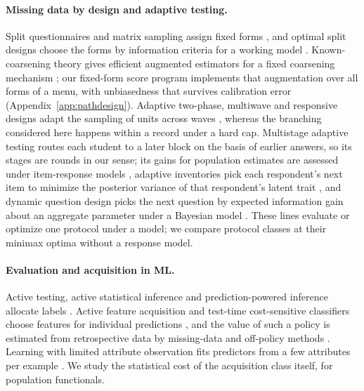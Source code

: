 \documentclass{article}
\begin{document}
\paragraph{Missing data by design and adaptive testing.} Split questionnaires and matrix sampling assign fixed forms \citep{raghunathan1995,graham2006,thomas2006,chipperfield2009,rhemtulla2012}, and optimal split designs choose the forms by information criteria for a working model \citep{adiguzel2008}. Known-coarsening theory gives efficient augmented estimators for a fixed coarsening mechanism \citep{robins1994,tsiatis2006}; our fixed-form score program implements that augmentation over all forms of a menu, with unbiasedness that survives calibration error (Appendix~\ref{app:pathdesign}). Adaptive two-phase, multiwave and responsive designs adapt the sampling of units across waves \citep{groves2006,tao2020,chen2020,chen2022}, whereas the branching considered here happens within a record under a hard cap. Multistage adaptive testing routes each student to a later block on the basis of earlier answers, so its stages are rounds in our sense; its gains for population estimates are assessed under item-response models \citep{yamamoto2018,fink2024,konig2026}, adaptive inventories pick each respondent's next item to minimize the posterior variance of that respondent's latent trait \citep{montgomery2020,zhang2020}, and dynamic question design picks the next question by expected information gain about an aggregate parameter under a Bayesian model \citep{fukuda2026}. These lines evaluate or optimize one protocol under a model; we compare protocol classes at their minimax optima without a response model.

\paragraph{Evaluation and acquisition in ML.} Active testing, active statistical inference and prediction-powered inference allocate labels \citep{kossen2021,zrnic2024,angelopoulos2023}. Active feature acquisition and test-time cost-sensitive classifiers choose features for individual predictions \citep{turney1995,trapeznikov2013,nan2017,ma2019,covert2023}, and the value of such a policy is estimated from retrospective data by missing-data and off-policy methods \citep{vonkleist2025}. Learning with limited attribute observation fits predictors from a few attributes per example \citep{bendavid1998,cesa2011,hazan2012}. We study the statistical cost of the acquisition class itself, for population functionals.
\end{document}
